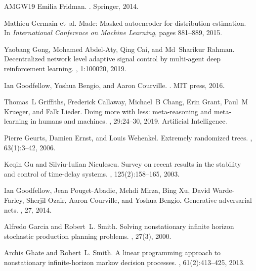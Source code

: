 \begin{thebibliography}{AMGW{\etalchar{+}}19}
Emilia Fridman.
.
\newblock Springer, 2014.

Mathieu Germain et~al.
\newblock Made: Masked autoencoder for distribution estimation.
\newblock In {\em International Conference on Machine Learning}, pages 881--889, 2015.

Yaobang Gong, Mohamed Abdel-Aty, Qing Cai, and Md~Sharikur Rahman.
\newblock Decentralized network level adaptive signal control by multi-agent deep reinforcement learning.
, 1:100020, 2019.

Ian Goodfellow, Yoshua Bengio, and Aaron Courville.
.
\newblock MIT press, 2016.

Thomas~L Griffiths, Frederick Callaway, Michael~B Chang, Erin Grant, Paul~M Krueger, and Falk Lieder.
\newblock Doing more with less: meta-reasoning and meta-learning in humans and machines.
, 29:24--30, 2019.
\newblock Artificial Intelligence.

Pierre Geurts, Damien Ernst, and Louis Wehenkel.
\newblock Extremely randomized trees.
, 63(1):3--42, 2006.

Keqin Gu and Silviu-Iulian Niculescu.
\newblock Survey on recent results in the stability and control of time-delay systems.
, 125(2):158--165, 2003.

Ian Goodfellow, Jean Pouget-Abadie, Mehdi Mirza, Bing Xu, David Warde-Farley, Sherjil Ozair, Aaron Courville, and Yoshua Bengio.
\newblock Generative adversarial nets.
, 27, 2014.

Alfredo Garcia and Robert~L. Smith.
\newblock Solving nonstationary infinite horizon stochastic production planning problems.
, 27(3), 2000.

Archis Ghate and Robert~L. Smith.
\newblock A linear programming approach to nonstationary infinite-horizon markov decision processes.
, 61(2):413--425, 2013.


\end{thebibliography}
